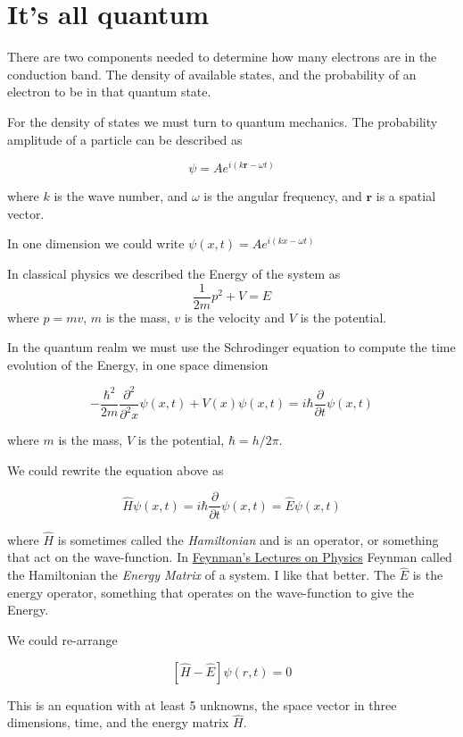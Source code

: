 \section{It's all quantum}\label{its-all-quantum}

There are two components needed to determine how many electrons are in
the conduction band. The density of available states, and the
probability of an electron to be in that quantum state.

For the density of states we must turn to quantum mechanics. The
probability amplitude of a particle can be described as

\[\psi = Ae^{i(k \textbf{r} - \omega t)}\]

where \(k\) is the wave number, and \(\omega\) is the angular frequency,
and \(\textbf{r}\) is a spatial vector.

In one dimension we could write \(\psi(x,t) = Ae^{i(kx - \omega t)}\)

In classical physics we described the Energy of the system as
\[\frac{1}{2 m} p^2 + V = E\] where \(p = m v\), \(m\) is the mass,
\(v\) is the velocity and \(V\) is the potential.

In the quantum realm we must use the Schrodinger equation to compute the
time evolution of the Energy, in one space dimension

\[-\frac{\hbar^2}{2 m} \frac{\partial^2}{\partial^2 x}\psi(x,t) +
V(x)\psi(x,t) = i\hbar\frac{\partial}{\partial t} \psi(x,t) \]

where \(m\) is the mass, \(V\) is the potential, \(\hbar = h/2\pi\).

We could rewrite the equation above as

\[ \widehat{H} \psi(x,t) = i \hbar \frac{\partial}{\partial t}  \psi(x,t)  =
\widehat{E}  \psi(x,t)\]

where \(\widehat{H}\) is sometimes called the \emph{Hamiltonian} and is
an operator, or something that act on the wave-function. In
\href{https://www.feynmanlectures.caltech.edu}{Feynman's Lectures on
Physics} Feynman called the Hamiltonian the \emph{Energy Matrix} of a
system. I like that better. The \(\widehat{E}\) is the energy operator,
something that operates on the wave-function to give the Energy.

We could re-arrange

\[ [\widehat{H} - \widehat{E}]\psi(r,t) = 0\]

This is an equation with at least 5 unknowns, the space vector in three
dimensions, time, and the energy matrix \(\widehat{H}\).

